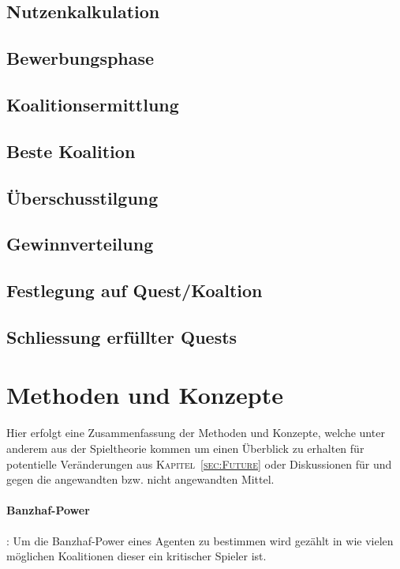 \documentclass[fleqn,10pt]{SelfArx} %
\newcommand{\ChapterCite}[1]{\textsc{Kapitel~\ref{#1}}}
\begin{document}
\subsection{Nutzenkalkulation}

\subsection{Bewerbungsphase}

\subsection{Koalitionsermittlung}

\subsection{Beste Koalition}

\subsection{Überschusstilgung}

\subsection{Gewinnverteilung}

\subsection{Festlegung auf Quest/Koaltion}

\subsection{Schliessung erfüllter Quests}

\section{Methoden und Konzepte}
\label{sec:Methoden}
Hier erfolgt eine Zusammenfassung der Methoden und Konzepte, welche unter anderem aus der Spieltheorie kommen um einen Überblick zu erhalten für potentielle Veränderungen aus \ChapterCite{sec:Future} oder Diskussionen für und gegen die angewandten bzw. nicht angewandten Mittel.

\paragraph{Banzhaf-Power}: 
Um die Banzhaf-Power eines Agenten zu bestimmen wird gezählt in wie vielen möglichen Koalitionen dieser ein kritischer Spieler ist.
\end{document}
